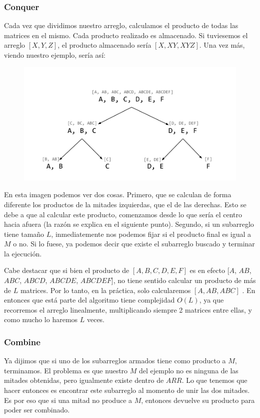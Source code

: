 \subsubsection{Conquer}
Cada vez que dividimos nuestro arreglo, calculamos el producto de todas las matrices en el mismo. Cada producto realizado es almacenado. Si tuviesemos el arreglo $[X, Y, Z]$, el producto almacenado sería $[X, XY, XYZ]$. Una vez más, viendo nuestro ejemplo, sería así:
\begin{figure}[H]
\centering
\includegraphics[scale=0.35]{Imagenes/ej4-ejem2}
\end{figure}

En esta imagen podemos ver dos cosas. Primero, que se calculan de forma diferente los productos de la mitades izquierdas, que el de las derechas. Esto se debe a que al calcular este producto, comenzamos desde lo que sería el centro hacia afuera (la razón se explica en el siguiente punto). Segundo, si un subarreglo tiene tamaño $L$, inmediatemente nos podemos fijar si el producto final es igual a $M$ o no. Si lo fuese, ya podemos decir que existe el subarreglo buscado y terminar la ejecución. 

Cabe destacar que si bien el producto de $[A, B, C, D, E, F]$ es en efecto [$A$, $AB$, $ABC$, $ABCD$, $ABCDE$, $ABCDEF$], no tiene sentido calcular un producto de más de $L$ matrices. Por lo tanto, en la práctica, solo calcularemos $[A, AB, ABC]$ . En entonces que está parte del algoritmo tiene complejidad $O(L)$, ya que recorremos el arreglo linealmente, multiplicando siempre 2 matrices entre ellas, y como mucho lo haremos $L$ veces.

\subsubsection{Combine}
Ya dijimos que si uno de los subarreglos armados tiene como producto a $M$, terminamos. El problema es que nuestro $M$ del ejemplo no es ninguna de las mitades obtenidas, pero igualmente existe dentro de $ARR$. Lo que tenemos que hacer entonces es encontrar este subarreglo al momento de unir las dos mitades. Es por eso que si una mitad no produce a $M$, entonces devuelve su producto para poder ser combinado.

